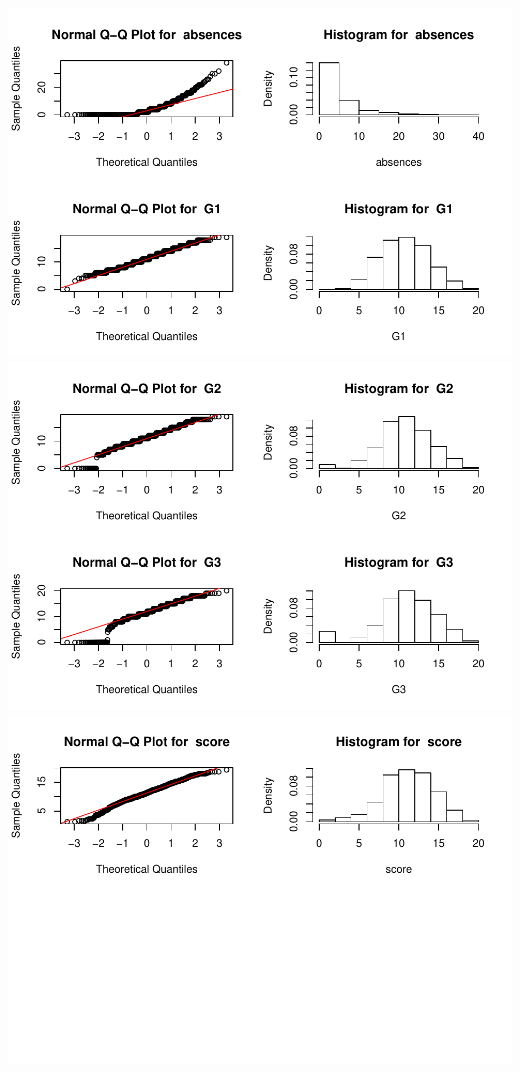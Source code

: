 \documentclass[]{article}
\begin{document}
\includegraphics{Practica2_files/figure-latex/unnamed-chunk-41-7.pdf}
\includegraphics{Practica2_files/figure-latex/unnamed-chunk-41-8.pdf}
\includegraphics{Practica2_files/figure-latex/unnamed-chunk-41-9.pdf}
\end{document}
